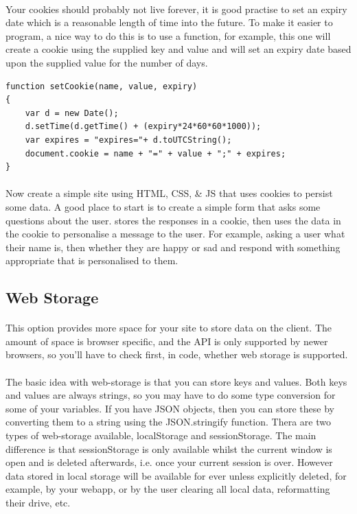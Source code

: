\documentclass[10pt, a4paper, twosize]{article}
\begin{document}
\paragraph{} Your cookies should probably not live forever, it is good practise to set an expiry date which is a reasonable length of time into the future. To make it easier to program, a nice way to do this is to use a function, for example, this one will create a cookie using the supplied key and value and will set an expiry date based upon the supplied value for the number of days.

\begin{lstlisting}
function setCookie(name, value, expiry)
{
    var d = new Date();
    d.setTime(d.getTime() + (expiry*24*60*60*1000));
    var expires = "expires="+ d.toUTCString();
    document.cookie = name + "=" + value + ";" + expires;
}
\end{lstlisting}

\paragraph{} Now create a simple site using HTML, CSS, \& JS that uses cookies to persist some data. A good place to start is to create a simple form that asks some questions about the user. stores the responses in a cookie, then uses the data in the cookie to personalise a message to the user. For example, asking a user what their name is, then whether they are happy or sad and respond with something appropriate that is personalised to them.

\subsection{Web Storage}

\paragraph{} This option provides more space for your site to store data on the client. The amount of space is browser specific, and the API is only supported by newer browsers, so you'll have to check first, in code, whether web storage is supported.

\paragraph{} The basic idea with web-storage is that you can store keys and values. Both keys and values are always strings, so you may have to do some type conversion for some of your variables. If you have JSON objects, then you can store these by converting them to a string using the JSON.stringify function. Thera are two types of web-storage available, localStorage and sessionStorage. The main difference is that sessionStorage is only available whilst the current window is open and is deleted afterwards, i.e. once your current session is over. However data stored in local storage will be available for ever unless explicitly deleted, for example, by your webapp, or by the user clearing all local data, reformatting their drive, etc.
\end{document}
